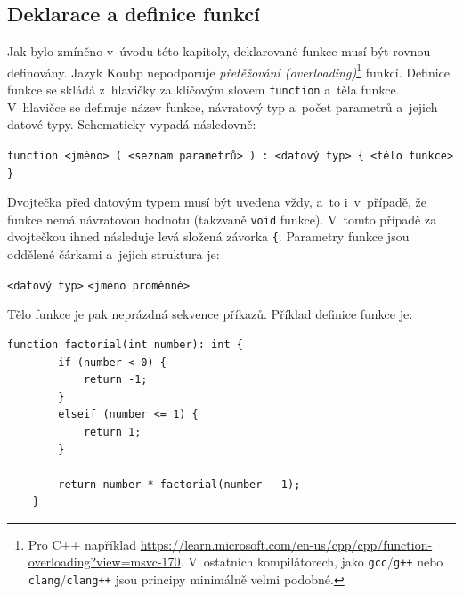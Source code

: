 \subsection*{Deklarace a definice funkcí}
Jak bylo zmíněno v~úvodu této kapitoly, deklarované funkce musí být rovnou definovány.
Jazyk Koubp nepodporuje \emph{přetěžování (overloading)}\footnote{Pro C++ například \href{https://learn.microsoft.com/en-us/cpp/cpp/function-overloading?view=msvc-170}{https://learn.microsoft.com/en-us/cpp/cpp/function-overloading?view=msvc-170}. V~ostatních kompilátorech, jako \texttt{gcc}/\texttt{g++} nebo \texttt{clang}/\texttt{clang++} jsou principy minimálně velmi podobné. } funkcí.
Definice funkce se skládá z~hlavičky za klíčovým slovem \texttt{function} a~těla funkce.
V~hlavičce se definuje název funkce, návratový typ a~počet parametrů a~jejich datové typy.
Schematicky vypadá následovně:
\begin{center}
    \texttt{function <jméno> ( <seznam parametrů> ) : <datový typ> \{ <tělo funkce> \}}
\end{center}
Dvojtečka před datovým typem musí být uvedena vždy, a~to i~v~případě, že funkce nemá návratovou hodnotu (takzvaně \texttt{void} funkce).
V~tomto případě za dvojtečkou ihned následuje levá složená závorka \texttt{\{}.
Parametry funkce jsou oddělené čárkami a~jejich struktura je:
\begin{center}
     \texttt{<datový typ>} \texttt{<jméno proměnné>}
\end{center}
Tělo funkce je pak neprázdná sekvence příkazů.
Příklad definice funkce je:
\begin{lstlisting}[language=Koubp]
    function factorial(int number): int {
        if (number < 0) {
            return -1;
        }
        elseif (number <= 1) {
            return 1;
        }

        return number * factorial(number - 1);
    }
\end{lstlisting}

